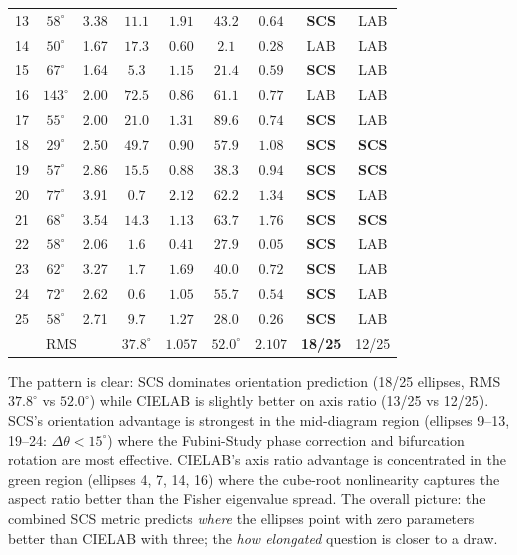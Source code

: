 \documentclass[12pt,a4paper]{article}
\begin{document}
\begin{table}[ht]
\begin{tabular}{ccccccccc}
13 & $58^\circ$  & 3.38 & $\mathbf{11.1}$ & $1.91$ & $43.2$ & $\mathbf{0.64}$ & \textbf{SCS} & LAB \\
14 & $50^\circ$  & 1.67 & $17.3$ & $0.60$ & $\mathbf{2.1}$  & $\mathbf{0.28}$ & LAB & LAB \\
15 & $67^\circ$  & 1.64 & $\mathbf{5.3}$  & $1.15$ & $21.4$ & $\mathbf{0.59}$ & \textbf{SCS} & LAB \\
16 & $143^\circ$ & 2.00 & $72.5$ & $0.86$ & $\mathbf{61.1}$ & $\mathbf{0.77}$ & LAB & LAB \\
17 & $55^\circ$  & 2.00 & $\mathbf{21.0}$ & $1.31$ & $89.6$ & $\mathbf{0.74}$ & \textbf{SCS} & LAB \\
18 & $29^\circ$  & 2.50 & $\mathbf{49.7}$ & $\mathbf{0.90}$ & $57.9$ & $1.08$ & \textbf{SCS} & \textbf{SCS} \\
19 & $57^\circ$  & 2.86 & $\mathbf{15.5}$ & $\mathbf{0.88}$ & $38.3$ & $0.94$ & \textbf{SCS} & \textbf{SCS} \\
20 & $77^\circ$  & 3.91 & $\mathbf{0.7}$  & $2.12$ & $62.2$ & $\mathbf{1.34}$ & \textbf{SCS} & LAB \\
21 & $68^\circ$  & 3.54 & $\mathbf{14.3}$ & $\mathbf{1.13}$ & $63.7$ & $1.76$ & \textbf{SCS} & \textbf{SCS} \\
22 & $58^\circ$  & 2.06 & $\mathbf{1.6}$  & $0.41$ & $27.9$ & $\mathbf{0.05}$ & \textbf{SCS} & LAB \\
23 & $62^\circ$  & 3.27 & $\mathbf{1.7}$  & $1.69$ & $40.0$ & $\mathbf{0.72}$ & \textbf{SCS} & LAB \\
24 & $72^\circ$  & 2.62 & $\mathbf{0.6}$  & $1.05$ & $55.7$ & $\mathbf{0.54}$ & \textbf{SCS} & LAB \\
25 & $58^\circ$  & 2.71 & $\mathbf{9.7}$  & $1.27$ & $28.0$ & $\mathbf{0.26}$ & \textbf{SCS} & LAB \\
\midrule
\multicolumn{3}{c}{RMS}  & $\mathbf{37.8^\circ}$ & $1.057$ & $52.0^\circ$ & $\mathbf{2.107}$ & \textbf{18/25} & 12/25 \\
\bottomrule
\end{tabular}
\end{table}

The pattern is clear: SCS dominates orientation prediction (18/25
ellipses, RMS $37.8^\circ$ vs $52.0^\circ$) while CIELAB is slightly
better on axis ratio (13/25 vs 12/25). SCS's orientation advantage
is strongest in the mid-diagram region (ellipses 9--13, 19--24:
$\Delta\theta < 15^\circ$) where the Fubini-Study phase correction
and bifurcation rotation are most effective. CIELAB's axis ratio
advantage is concentrated in the green region (ellipses 4, 7, 14, 16)
where the cube-root nonlinearity captures the aspect ratio better
than the Fisher eigenvalue spread. The overall picture: the combined
SCS metric predicts \emph{where} the ellipses point with zero
parameters better than CIELAB with three; the \emph{how elongated}
question is closer to a draw.
\end{document}
